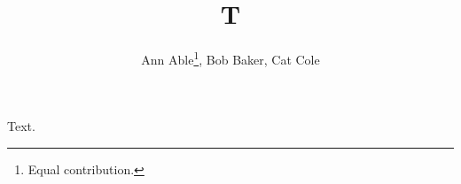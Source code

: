 \documentclass{article}
\newcommand*\samethanks[1][\value{footnote}]{\footnotemark[#1]}
\begin{document}
\title{T}
\author{Ann Able\thanks{Equal contribution.}, Bob Baker\samethanks, Cat Cole}
\maketitle
Text.
\end{document}
